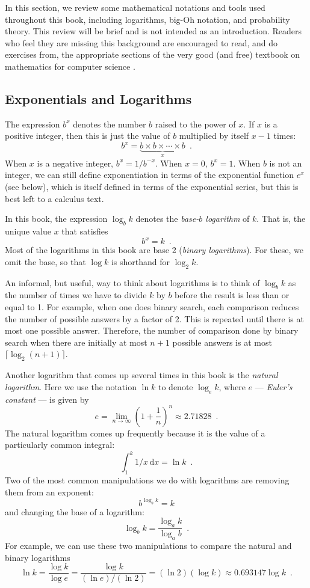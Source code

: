In this section, we review some mathematical notations and tools
used throughout this book, including logarithms, big-Oh notation, and
probability theory.  This review will be brief and is not intended as
an introduction. Readers who feel they are missing this background are
encouraged to read, and do exercises from, the appropriate sections of
the very good (and free) textbook on mathematics for computer science
\cite{llm11}.

\subsection{Exponentials and Logarithms}

%
The expression $b^x$ denotes the number $b$ raised to the power of $x$.
If $x$ is a positive integer, then this is just the value of $b$
multiplied by itself $x-1$ times:
\[
    b^x = \underbrace{b\times b\times \cdots \times b}_{x} \enspace .
\]
When $x$ is a negative integer, $b^x=1/b^{-x}$.  When $x=0$, $b^x=1$.
When $b$ is not an integer, we can still define exponentiation in terms
of the exponential function $e^x$ (see below), which is itself defined in
terms of the exponential series, but this is best left to a calculus text.

%
In this book, the expression $\log_b k$ denotes the \emph{base-$b$ logarithm}
of $k$.  That is, the unique value $x$ that satisfies
\[
    b^{x} = k  \enspace .
\]
Most of the logarithms in this book are base 2 (\emph{binary logarithms}).
%
%
For these, we omit the base, so that $\log k$ is shorthand for
$\log_2 k$.

An informal, but useful, way to think about logarithms is to think
of $\log_b k$ as the number of times we have to divide $k$ by $b$
before the result is less than or equal to 1.  For example, when one
does binary search, each comparison reduces the number of possible
answers by a factor of 2.  This is repeated until there is at most one
possible answer.  Therefore, the number of comparison done by binary
search when there are initially at most $n+1$ possible answers is at
most $\lceil\log_2(n+1)\rceil$.

%
%
Another logarithm that comes up several times in this book is the
\emph{natural logarithm}.  Here we use the notation $\ln k$ to denote
$\log_e k$, where $e$ --- \emph{Euler's constant} --- is given by
%
%
\[
   e = \lim_{n\rightarrow\infty} \left(1+\frac{1}{n}\right)^n
   \approx  2.71828 \enspace .
\]
The natural logarithm comes up frequently because it is the value
of a particularly common integral:
\[
    \int_{1}^{k} 1/x\,\mathrm{d}x  = \ln k \enspace .
\]
Two of the most common manipulations we do with logarithms are removing
them from an exponent:
\[
    b^{\log_b k} = k
\]
and changing the base of a logarithm:
\[
    \log_b k = \frac{\log_a k}{\log_a b} \enspace .
\]
For example, we can use these two manipulations to compare the natural and binary logarithms
\[
   \ln k = \frac{\log k}{\log e} = \frac{\log k}{(\ln e)/(\ln 2)} = 
    (\ln 2)(\log k) \approx 0.693147\log k \enspace .
\]

